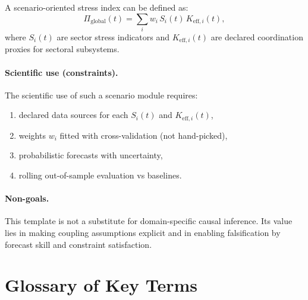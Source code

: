 \documentclass[13pt,a4paper]{article}
\begin{document}
	A scenario-oriented stress index can be defined as:
	$$
	\Pi_{\mathrm{global}}(t) = \sum_i w_i\,S_i(t)\,K_{\mathrm{eff},i}(t),
	$$
	where $S_i(t)$ are sector stress indicators and $K_{\mathrm{eff},i}(t)$ are declared coordination proxies for sectoral subsystems.
	
	\paragraph{Scientific use (constraints).}
	The scientific use of such a scenario module requires:
	\begin{enumerate}[leftmargin=*]
		\item declared data sources for each $S_i(t)$ and $K_{\mathrm{eff},i}(t)$,
		\item weights $w_i$ fitted with cross-validation (not hand-picked),
		\item probabilistic forecasts with uncertainty,
		\item rolling out-of-sample evaluation vs baselines.
	\end{enumerate}
	
	\paragraph{Non-goals.}
	This template is not a substitute for domain-specific causal inference. Its value lies in making coupling assumptions explicit and in enabling falsification by forecast skill and constraint satisfaction.
	
	\section*{Glossary of Key Terms}
	
\end{document}
